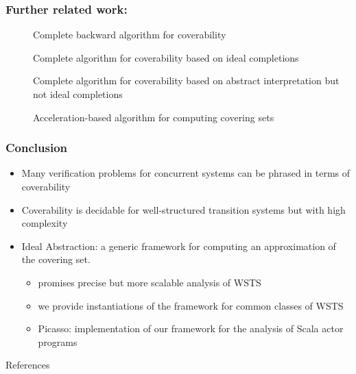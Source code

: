 \documentclass{beamer}
\begin{document}
\begin{frame}
  \frametitle{Further related work:}

  \begin{description}
  \item[\cite{DBLP:conf/lics/AbdullaCJT96}]
  Complete backward algorithm for coverability
  \item[\cite{GeeraertsETAL06ExpandEnlargeCheck}]
  Complete algorithm for coverability based on ideal completions  
  \item[\cite{DBLP:conf/vmcai/GantyRB06}]
  Complete algorithm for coverability based on abstract interpretation but not ideal completions
  \item[\cite{FinkelGoubaultLarrecq09ForwardAnalysisForWSTS}]
  Acceleration-based algorithm for computing covering sets
  \end{description}

\end{frame}

\begin{frame}
  \frametitle{Conclusion}
  \begin{itemize}
  \item Many verification problems for concurrent systems can be phrased in terms of coverability
  \item Coverability is decidable for well-structured transition systems but with high complexity
  \item \alert{Ideal Abstraction}: a generic framework for computing an approximation of the covering set.
    \begin{itemize}
    \item promises precise but more scalable analysis of WSTS
    \item we provide instantiations of the framework for common classes of WSTS
    \item \alert{Picasso}: implementation of our framework for the analysis of Scala actor programs
    \end{itemize}
  \end{itemize}
\end{frame}

\begin{frame}[allowframebreaks]{References}
  \frametitle{}
  {\tiny
  
  
  }
\end{frame}
\end{document}
